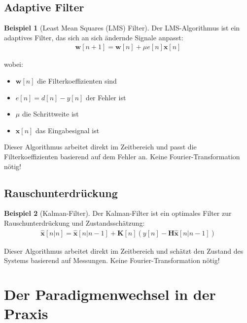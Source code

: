 ﻿\documentclass[a4paper,12pt]{report}
\theoremstyle{definition}
\newtheorem{beispiel}{Beispiel}
\begin{document}
	\subsection{Adaptive Filter}
	
	\begin{beispiel}[Least Mean Squares (LMS) Filter]
		
		Der LMS-Algorithmus ist ein adaptives Filter, das sich an sich ändernde Signale anpasst:
		\begin{align}
			\mathbf{w}[n+1] = \mathbf{w}[n] + \mu e[n] \mathbf{x}[n]
		\end{align}
		
		wobei:
		\begin{itemize}
			\item[-] $\mathbf{w}[n]$ die Filterkoeffizienten sind
			\item[-] $e[n] = d[n] - y[n]$ der Fehler ist
			\item[-] $\mu$ die Schrittweite ist
			\item[-] $\mathbf{x}[n]$ das Eingabesignal ist
		\end{itemize}
		
		Dieser Algorithmus arbeitet direkt im Zeitbereich und passt die Filterkoeffizienten basierend auf dem Fehler an. Keine Fourier-Transformation nötig!
	\end{beispiel}
	
	\subsection{Rauschunterdrückung}
	
	\begin{beispiel}[Kalman-Filter]
		
		Der Kalman-Filter ist ein optimales Filter zur Rauschunterdrückung und Zustandsschätzung:
		\begin{align}
			\hat{\mathbf{x}}[n|n] = \hat{\mathbf{x}}[n|n-1] + \mathbf{K}[n] (y[n] - \mathbf{H} \hat{\mathbf{x}}[n|n-1])
		\end{align}
		
		Dieser Algorithmus arbeitet direkt im Zeitbereich und schätzt den Zustand des Systems basierend auf Messungen. Keine Fourier-Transformation nötig!
	\end{beispiel}
	
	\section{Der Paradigmenwechsel in der Praxis}
	
\end{document}

